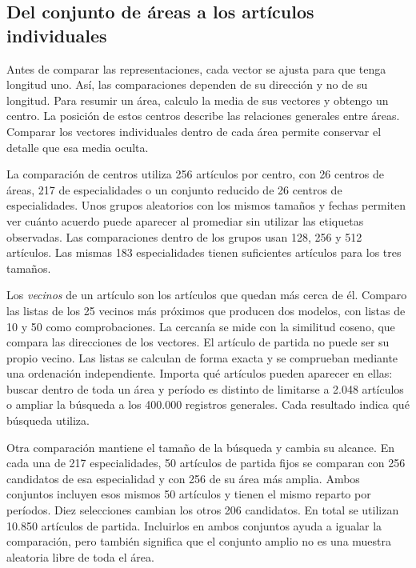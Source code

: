 \documentclass[12pt]{article}
\begin{document}
\subsection{Del conjunto de áreas a los artículos individuales}
Antes de comparar las representaciones, cada vector se ajusta para que tenga longitud uno. Así, las comparaciones dependen de su dirección y no de su longitud. Para resumir un área, calculo la media de sus vectores y obtengo un centro. La posición de estos centros describe las relaciones generales entre áreas. Comparar los vectores individuales dentro de cada área permite conservar el detalle que esa media oculta.

La comparación de centros utiliza 256 artículos por centro, con 26 centros de áreas, 217 de especialidades o un conjunto reducido de 26 centros de especialidades. Unos grupos aleatorios con los mismos tamaños y fechas permiten ver cuánto acuerdo puede aparecer al promediar sin utilizar las etiquetas observadas. Las comparaciones dentro de los grupos usan 128, 256 y 512 artículos. Las mismas 183 especialidades tienen suficientes artículos para los tres tamaños.

Los \emph{vecinos} de un artículo son los artículos que quedan más cerca de él. Comparo las listas de los 25 vecinos más próximos que producen dos modelos, con listas de 10 y 50 como comprobaciones. La cercanía se mide con la similitud coseno, que compara las direcciones de los vectores. El artículo de partida no puede ser su propio vecino. Las listas se calculan de forma exacta y se comprueban mediante una ordenación independiente. Importa qué artículos pueden aparecer en ellas: buscar dentro de toda un área y período es distinto de limitarse a 2.048 artículos o ampliar la búsqueda a los 400.000 registros generales. Cada resultado indica qué búsqueda utiliza.

Otra comparación mantiene el tamaño de la búsqueda y cambia su alcance. En cada una de 217 especialidades, 50 artículos de partida fijos se comparan con 256 candidatos de esa especialidad y con 256 de su área más amplia. Ambos conjuntos incluyen esos mismos 50 artículos y tienen el mismo reparto por períodos. Diez selecciones cambian los otros 206 candidatos. En total se utilizan 10.850 artículos de partida. Incluirlos en ambos conjuntos ayuda a igualar la comparación, pero también significa que el conjunto amplio no es una muestra aleatoria libre de toda el área.
\end{document}

